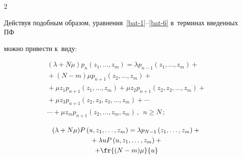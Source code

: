 \begin{multicols}{2}
\begin{enumerate}[(1)]
\end{enumerate}


 Действуя подобным образом, уравнения~\eqref{bat-1}--\eqref{bat-6} в~терминах введенных ПФ


 можно привести к~виду:


 \begin{multline*}




(\lambda+N\mu) p_{n}\left(z_1,\ldots,z_{m}\right) =


\lambda p_{n-1}\left(z_1,\ldots,z_{m}\right) +{}\\


{}+


(N-m) \mu p_{n+1}(z_2,\ldots,z_{m}) +{}


\\


{}+


\mu z_1 p_{n+1}\left(z_1,\ldots,z_{m}\right) +


\mu z_2 p_{n+1}\left(z_2,z_2,\ldots,z_{m}\right) +{}\\


{}+


\mu z_3 p_{n+1}\left(z_2,z_3,z_3,\ldots,z_{m}\right) + \cdots{}\\


{}\cdots + \mu z_m p_{n+1}\left(z_2,\ldots,z_{m},z_{m}\right)\,,\ \ n\ge N\,;


\end{multline*}





\vspace*{-24pt}





\noindent


\begin{multline}


\label{bat-z-2}


(\lambda+N\mu) P\left(u,z_1,\ldots,z_{m}\right)


= \lambda p_{N-1}\left(z_1,\ldots,z_{m}\right) +{}\\


{}+


\lambda u P\left(u,z_1,\ldots,z_{m}\right) +{}


\\


+


\fr{(N-m) \mu}{u}



\end{multline}
\end{multicols}
